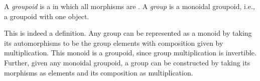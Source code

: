

\begin{dfn*}\label{cat:groupoid}
	A \emph{groupoid} is a  in which all morphisms are
	. A \emph{group} is a monoidal groupoid, i.e., a
	groupoid with one object.
\end{dfn*}

This is indeed a definition. Any group can be represented as a monoid by taking
its automorphisms to be the group elements with composition given by
multiplication. This monoid is a groupoid, since group multiplication is
invertible. Further, given any monoidal groupoid, a group can be constructed by
taking its morphisms as elements and its composition as multiplication.


